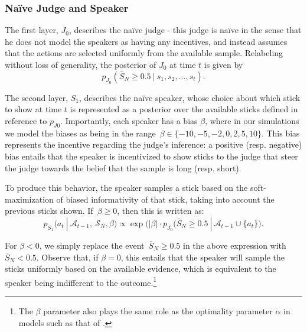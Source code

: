 \documentclass[10pt,letterpaper]{article}
\begin{document}
\subsubsection{Na\"ive Judge and Speaker}
The first layer, $J_0$, describes the na\"ive judge - this judge is na\"ive in the sense that he
does not model the speakers as having any incentives, and instead assumes that the actions are selected
uniformly from the available sample. Relabeling without loss of generality, the posterior of $J_0$ at time $t$ is given by
\begin{equation}
p_{J_0}( \bar{S}_N \ge 0.5 \ | \ s_1, s_2, ..., s_t).
\end{equation}

The second layer, $S_1$, describes the na\"ive speaker, whose choice about which stick to show
at time $t$ is represented as a posterior over the available sticks defined in reference to $p_{J0}$.
Importantly, each speaker has a bias $\beta$, where in our simulations we model the biases as being
in the range~${\beta \in \{-10, -5, -2, 0, 2, 5, 10\}}$. This bias represents the incentive regarding the judge's
inference: a positive (resp. negative) bias entails that the speaker is incentivized to show sticks to the judge
that steer the judge towards the belief that the sample is long (resp. short).

To produce this behavior, the speaker samples a stick based on the soft-maximization of biased informativity
of that stick, taking into account the previous sticks shown. If~${\beta\ge 0}$, then this is written as:
\begin{equation}\label{S1}
p_{S_1} (a_t \ | \ \mathcal{A}_{t-1},\ \mathcal{S}_N, \beta) \propto \exp \bigl(\lvert\beta\rvert \cdot p_{J_0} (\bar{S}_N \ge 0.5 \ | \ \mathcal{A}_{t-1} \cup \{a_t\} \bigr).
\end{equation}

For $\beta<0$, we simply replace the event~${\bar{S}_N \ge 0.5}$ in the above expression with~${\bar{S}_N < 0.5}$.
Observe that, if $\beta = 0$, this entails that the speaker will sample the sticks uniformly based on the available
evidence, which is equivalent to the speaker being indifferent to the outcome.\footnote{The $\beta$ parameter also 
plays the same role as the optimality parameter $\alpha$ in models such as that of .}
\end{document}
